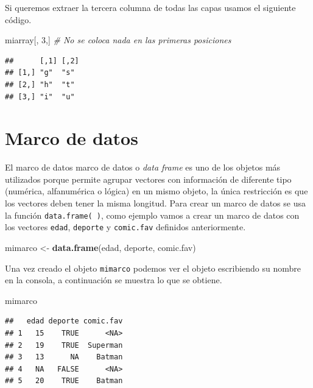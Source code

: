 \documentclass[10pt,]{krantz}
\makeatletter
\newenvironment{Shaded}{\begin{snugshade}}{\end{snugshade}}
\newcommand{\KeywordTok}[1]{\textcolor[rgb]{0.13,0.29,0.53}{\textbf{{#1}}}}
\newcommand{\DecValTok}[1]{\textcolor[rgb]{0.00,0.00,0.81}{{#1}}}
\newcommand{\StringTok}[1]{\textcolor[rgb]{0.31,0.60,0.02}{{#1}}}
\newcommand{\CommentTok}[1]{\textcolor[rgb]{0.56,0.35,0.01}{\textit{{#1}}}}
\newcommand{\NormalTok}[1]{{#1}}
\newenvironment{kframe}{%
\medskip{}
\setlength{\fboxsep}{.8em}
 \def\at@end@of@kframe{}%
 \ifinner\ifhmode%
  \def\at@end@of@kframe{\end{minipage}}%
  \begin{minipage}{\columnwidth}%
 \fi\fi%
 \def\FrameCommand##1{\hskip\@totalleftmargin \hskip-\fboxsep
 \colorbox{shadecolor}{##1}\hskip-\fboxsep
     \hskip-\linewidth \hskip-\@totalleftmargin \hskip\columnwidth}%
 \MakeFramed {\advance\hsize-\width
   \@totalleftmargin\z@ \linewidth\hsize
   \@setminipage}}%
 {\par\unskip\endMakeFramed%
 \at@end@of@kframe}
\renewenvironment{Shaded}{\begin{kframe}}{\end{kframe}}
\makeatother
\begin{document}
Si queremos extraer la tercera columna de todas las capas usamos el
siguiente código.

\begin{Shaded}
\begin{Highlighting}[]
\NormalTok{miarray[, }\DecValTok{3}\NormalTok{,]  }\CommentTok{# No se coloca nada en las primeras posiciones}
\end{Highlighting}
\end{Shaded}

\begin{verbatim}
##      [,1] [,2]
## [1,] "g"  "s" 
## [2,] "h"  "t" 
## [3,] "i"  "u"
\end{verbatim}

\section{\texorpdfstring{Marco de datos 
 \label{marcodatos}
\label{marcodatos}}{Marco de datos    }}\label{marco-de-datos}

El marco de datos marco de datos o \emph{data frame} es uno de los
objetos más utilizados porque permite agrupar vectores con información
de diferente tipo (numérica, alfanumérica o lógica) en un mismo objeto,
la única restricción es que los vectores deben tener la misma longitud.
Para crear un marco de datos se usa la función \texttt{data.frame(\ )},
como ejemplo vamos a crear un marco de datos con los vectores
\texttt{edad}, \texttt{deporte} y \texttt{comic.fav} definidos
anteriormente.

\begin{Shaded}
\begin{Highlighting}[]
\NormalTok{mimarco <-}\StringTok{ }\KeywordTok{data.frame}\NormalTok{(edad, deporte, comic.fav)}
\end{Highlighting}
\end{Shaded}

Una vez creado el objeto \texttt{mimarco} podemos ver el objeto
escribiendo su nombre en la consola, a continuación se muestra lo que se
obtiene.

\begin{Shaded}
\begin{Highlighting}[]
\NormalTok{mimarco}
\end{Highlighting}
\end{Shaded}

\begin{verbatim}
##   edad deporte comic.fav
## 1   15    TRUE      <NA>
## 2   19    TRUE  Superman
## 3   13      NA    Batman
## 4   NA   FALSE      <NA>
## 5   20    TRUE    Batman
\end{verbatim}
\end{document}

